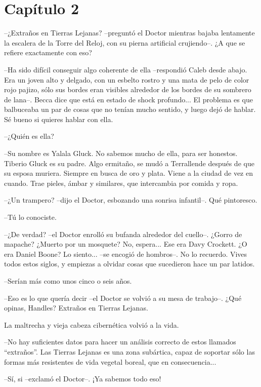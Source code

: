 \chapter*{Capítulo 2}

--¿Extraños en Tierras Lejanas? --preguntó el Doctor mientras bajaba lentamente la escalera de la Torre del Reloj, con su pierna artificial crujiendo--. ¿A que se refiere exactamente con eso?
 
--Ha sido difícil conseguir algo coherente de ella --respondió Caleb desde abajo. Era un joven alto y delgado, con un esbelto rostro y una mata de pelo de color rojo pajizo, sólo sus bordes eran visibles alrededor de los bordes de su sombrero de lana--. Becca dice que está en estado de shock profundo... El problema es que balbuceaba un par de cosas que no tenían mucho sentido, y luego dejó de hablar. Sé bueno si quieres hablar con ella.
 
--¿Quién es ella?
 
--Su nombre es Yalala Gluck. No sabemos mucho de ella, para ser honestos. Tiberio Gluck es su padre. Algo ermitaño, se mudó a Terrallende después de que su esposa muriera. Siempre en busca de oro y plata. Viene a la ciudad de vez en cuando. Trae pieles, ámbar y similares, que intercambia por comida y ropa.
 
--¿Un trampero? --dijo el Doctor, esbozando una sonrisa infantil--. Qué pintoresco.
 
--Tú lo conociste.
 
--¿De verdad? --el Doctor enrolló su bufanda alrededor del cuello--. ¿Gorro de mapache? ¿Muerto por un mosquete? No, espera... Ese era Davy Crockett. ¿O era Daniel Boone? Lo siento... --se encogió de hombros--. No lo recuerdo. Vives todos estos siglos, y empiezas a olvidar cosas que sucedieron hace un par latidos.
 
--Serían más como unos cinco o seis años.
 
--Eso es lo que quería decir --el Doctor se volvió a su mesa de trabajo--. ¿Qué opinas, Handles? Extraños en Tierras Lejanas.
 
La maltrecha y vieja cabeza cibernética volvió a la vida.
 
--No hay suficientes datos para hacer un análisis correcto de estos llamados ``extraños''. Las Tierras Lejanas es una zona subártica, capaz de soportar sólo las formas más resistentes de vida vegetal boreal, que en consecuencia...
 
--Sí, si --exclamó el Doctor--. ¡Ya sabemos todo eso!
 
